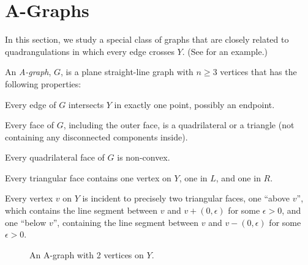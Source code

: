 \section{A-Graphs}

In this section, we study a special class of graphs that are closely
related to quadrangulations in which every edge crosses $Y$. (See  for an example.)

\begin{defn}
	An \emph{A-graph}, $G$, is a plane straight-line graph with $n\ge 3$ vertices that has the following properties:
	\begin{compactenum}
		\item Every edge of $G$ intersects $Y$ in exactly one point, possibly an endpoint.
		\item Every face of $G$, including the outer face, is
                  a quadrilateral or a triangle (not containing any
                  disconnected components inside).
		\item Every quadrilateral face of $G$ is non-convex.
		\item Every triangular face contains one vertex
 on $Y$, one in $L$, and one in $R$.  
		\item Every vertex $v$ on $Y$ is incident to precisely
		two triangular faces, one ``above $v$'', which
                contains the line segment between $v$ and
                $v+(0,\epsilon)$ for some $\epsilon>0$, and one ``below
                $v$'', containing the line segment between $v$ and $v-(0,\epsilon)$ for some $\epsilon >0$.
	\end{compactenum}
\end{defn}

\begin{figure}
		\caption{An A-graph with 2 vertices on $Y$.}
\end{figure}
	
